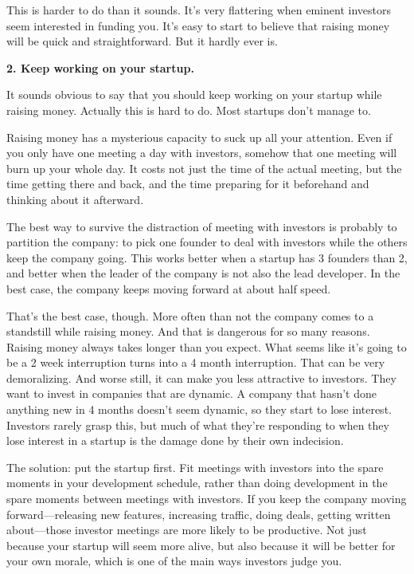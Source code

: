 \documentclass[12pt]{book}
\begin{document}
This is harder to do than it sounds. It's very flattering when eminent
investors seem interested in funding you. It's easy to start to believe
that raising money will be quick and straightforward. But it hardly ever
is.

\textbf{2. Keep working on your startup.}

It sounds obvious to say that you should keep working on your startup
while raising money. Actually this is hard to do. Most startups don't
manage to.

Raising money has a mysterious capacity to suck up all your attention.
Even if you only have one meeting a day with investors, somehow that one
meeting will burn up your whole day. It costs not just the time of the
actual meeting, but the time getting there and back, and the time
preparing for it beforehand and thinking about it afterward.

The best way to survive the distraction of meeting with investors is
probably to partition the company: to pick one founder to deal with
investors while the others keep the company going. This works better
when a startup has 3 founders than 2, and better when the leader of the
company is not also the lead developer. In the best case, the company
keeps moving forward at about half speed.

That's the best case, though. More often than not the company comes to a
standstill while raising money. And that is dangerous for so many
reasons. Raising money always takes longer than you expect. What seems
like it's going to be a 2 week interruption turns into a 4 month
interruption. That can be very demoralizing. And worse still, it can
make you less attractive to investors. They want to invest in companies
that are dynamic. A company that hasn't done anything new in 4 months
doesn't seem dynamic, so they start to lose interest. Investors rarely
grasp this, but much of what they're responding to when they lose
interest in a startup is the damage done by their own indecision.

The solution: put the startup first. Fit meetings with investors into
the spare moments in your development schedule, rather than doing
development in the spare moments between meetings with investors. If you
keep the company moving forward---releasing new features, increasing
traffic, doing deals, getting written about---those investor meetings
are more likely to be productive. Not just because your startup will
seem more alive, but also because it will be better for your own morale,
which is one of the main ways investors judge you.
\end{document}

